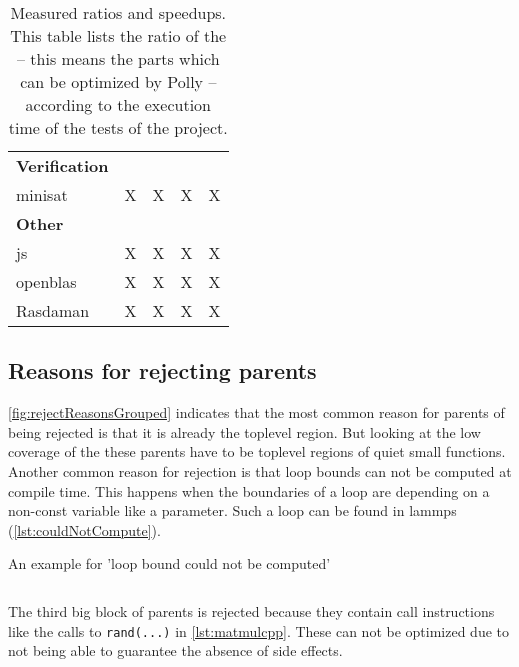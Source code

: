 \begin{table}[!h]
{\begin{minipage}{\textwidth}
\begin{tabularx}{\textwidth}{Xcccc}
                \midrule
                \textbf{Verification}\\
                minisat & X & X & X & X\\
                \midrule
                \textbf{Other}\\
                js & X & X & X & X\\
                openblas & X & X & X & X\\
                Rasdaman & X & X & X & X\\
                \bottomrule
            \end{tabularx}
            \caption[Measured ratios and speedups]{
                Measured ratios and speedups.
                This table lists the ratio of the \scops -- this means the parts which can be optimized by Polly -- according to the execution time of the tests of the project.
            }
            \label{tab:ratiosAndSpeedups}
        \end{minipage}
    }
\end{table}
\subsection{Reasons for rejecting parents}
\autoref{fig:rejectReasonsGrouped} indicates that the most common reason for parents of \scops being rejected is that it is already the toplevel region.
But looking at the low coverage of the \scops these parents have to be toplevel regions of quiet small functions.\\
Another common reason for rejection is that loop bounds can not be computed at compile time.
This happens \eg when the boundaries of a loop are depending on a non-const variable like a parameter.
Such a loop can be found in lammps (\autoref{lst:couldNotCompute}).
\begin{code}
    \caption{An example for 'loop bound could not be computed'}
    \inputminted{c}{c/nonAffineLoopBoundCouldNotCompute.c}
    \label{lst:couldNotCompute}
\end{code}
The third big block of parents is rejected because they contain call instructions like the calls to \texttt{rand(...)} in \autoref{lst:matmulcpp}.
These can not be optimized due to not being able to guarantee the absence of side effects.\\
